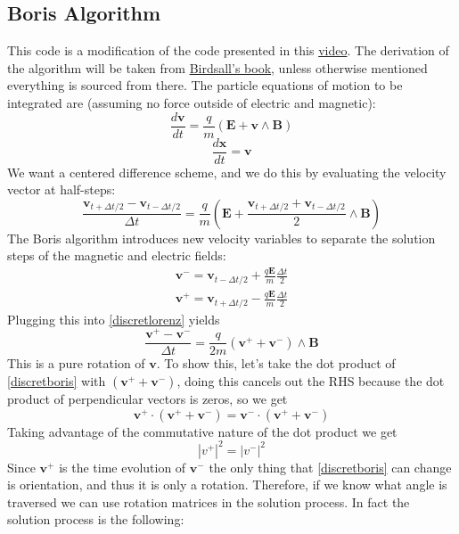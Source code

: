 \documentclass[12pt]{article}
\begin{document}
\subsection{Boris Algorithm}
This code is a modification of the code presented in this \href{https://www.youtube.com/watch?v=d4NlmGkfagk&t=889s&ab_channel=PyPhy}{video}. The derivation of the algorithm will be taken from \href{http://www.amazon.com/gp/product/0750310251/ref=as_li_ss_tl?ie=UTF8&tag=slovcook-20&linkCode=as2&camp=217145}{Birdsall's book}, unless otherwise mentioned everything is sourced from there\cite{Birdsall}.
The particle equations of motion to be integrated are (assuming no force outside of electric and magnetic): 
$$\frac{d\textbf{v}}{dt}=\frac{q}{m}\left(\textbf{E}+\textbf{v}\wedge\textbf{B}\right)$$
$$\frac{d\textbf{x}}{dt}=\textbf{v}$$
We want a centered difference scheme, and we do this by evaluating the velocity vector at half-steps:
\begin{equation}\label{discretlorenz}
\frac{\textbf{v}_{t+\Delta t/2}-\textbf{v}_{t-\Delta t/2}}{\Delta t}=\frac{q}{m}\left(\textbf{E}+\frac{\textbf{v}_{t+\Delta t/2}+\textbf{v}_{t-\Delta t/2}}{2}\wedge\textbf{B}\right)
\end{equation}
The Boris algorithm introduces new velocity variables to separate the solution steps of the magnetic and electric fields:
\begin{equation}\label{v+v-}
\begin{split}
\textbf{v}^-=\textbf{v}_{t-\Delta t/2}+\frac{q\textbf{E}}{m}\frac{\Delta t}{2}\\
\textbf{v}^+=\textbf{v}_{t+\Delta t/2}-\frac{q\textbf{E}}{m}\frac{\Delta t}{2}
\end{split}
\end{equation}
Plugging this into \eqref{discretlorenz} yields
\begin{equation}\label{discretboris}
\frac{\textbf{v}^+-\textbf{v}^-}{\Delta t}=\frac{q}{2m}(\textbf{v}^++\textbf{v}^-)\wedge\textbf{B}
\end{equation}
This is a pure rotation of $\textbf{v}$. To show this, let's take the dot product of \eqref{discretboris} with $(\textbf{v}^++\textbf{v}^-)$, doing this cancels out the RHS because the dot product of perpendicular vectors is zeros, so we get
$$\textbf{v}^+\cdot(\textbf{v}^++\textbf{v}^-)=\textbf{v}^-\cdot(\textbf{v}^++\textbf{v}^-)$$
Taking advantage of the commutative nature of the dot product we get
$$|v^+|^2=|v^-|^2$$
Since $\textbf{v}^+$ is the time evolution of $\textbf{v}^-$ the only thing that \eqref{discretboris} can change is orientation, and thus it is only a rotation. Therefore, if we know what angle is traversed we can use rotation matrices in the solution process. In fact the solution process is the following:
\end{document}
